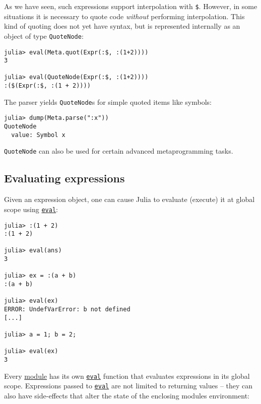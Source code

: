 As we have seen, such expressions support interpolation with \texttt{\$}. However, in some situations it is necessary to quote code \emph{without} performing interpolation. This kind of quoting does not yet have syntax, but is represented internally as an object of type \texttt{QuoteNode}:




\begin{verbatim}
julia> eval(Meta.quot(Expr(:$, :(1+2))))
3

julia> eval(QuoteNode(Expr(:$, :(1+2))))
:($(Expr(:$, :(1 + 2))))
\end{verbatim}



The parser yields \texttt{QuoteNode}s for simple quoted items like symbols:




\begin{verbatim}
julia> dump(Meta.parse(":x"))
QuoteNode
  value: Symbol x
\end{verbatim}



\texttt{QuoteNode} can also be used for certain advanced metaprogramming tasks.



\hypertarget{15751418549857902160}{}


\subsection{Evaluating expressions}



Given an expression object, one can cause Julia to evaluate (execute) it at global scope using \hyperlink{7507639810592563424}{\texttt{eval}}:




\begin{verbatim}
julia> :(1 + 2)
:(1 + 2)

julia> eval(ans)
3

julia> ex = :(a + b)
:(a + b)

julia> eval(ex)
ERROR: UndefVarError: b not defined
[...]

julia> a = 1; b = 2;

julia> eval(ex)
3
\end{verbatim}



Every \hyperlink{16725527896995457152}{module} has its own \hyperlink{7507639810592563424}{\texttt{eval}} function that evaluates expressions in its global scope. Expressions passed to \hyperlink{7507639810592563424}{\texttt{eval}} are not limited to returning values – they can also have side-effects that alter the state of the enclosing module{\textquotesingle}s environment:




